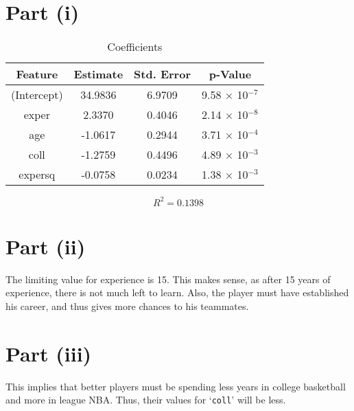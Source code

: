 \documentclass{./solution}
\author{%
    Bhavishya Desai\\[-1mm]
    160194
    \and
    Nikhil Bansal\\[-1mm]
    160447
    \and
    Nishant Maheshwari\\[-1mm]
    160458
    \and
    Harish Rajagopal\\[-1mm]
    160552
    \and
    Akhil Reddy\\[-1mm]
    160613
    \and
    Sameer Meena\\[-1mm]
    160616
}
\begin{document}
    \maketitle

    \begin{solution}[Wooldridge C6.9]
        \section*{Part (i)}
            \begin{table}[H]
                \caption{Coefficients}
                \begin{tabularx}{\textwidth}{C C C C}
                    \toprule
                    Feature & Estimate & Std. Error & p-Value \\
                    \midrule
                    (Intercept) & 34.9836 & 6.9709 & 9.58 $\times$ 10$^{-7}$ \\
                    exper       &  2.3370 & 0.4046 & 2.14 $\times$ 10$^{-8}$ \\
                    age         & -1.0617 & 0.2944 & 3.71 $\times$ 10$^{-4}$ \\
                    coll        & -1.2759 & 0.4496 & 4.89 $\times$ 10$^{-3}$ \\
                    expersq     & -0.0758 & 0.0234 & 1.38 $\times$ 10$^{-3}$ \\
                    \bottomrule
                \end{tabularx}
            \end{table}
            \vspace{-5mm}
            $$ R^2 = 0.1398 $$

        \section*{Part (ii)}
            The limiting value for experience is 15.
            This makes sense, as after 15 years of experience, there is not much left to learn.
            Also, the player must have established his career, and thus gives more chances to his teammates.

        \section*{Part (iii)}
            This implies that better players must be spending less years in college basketball and more in league NBA.\@
            Thus, their values for `\texttt{coll}' will be less.


\end{solution}
\end{document}
